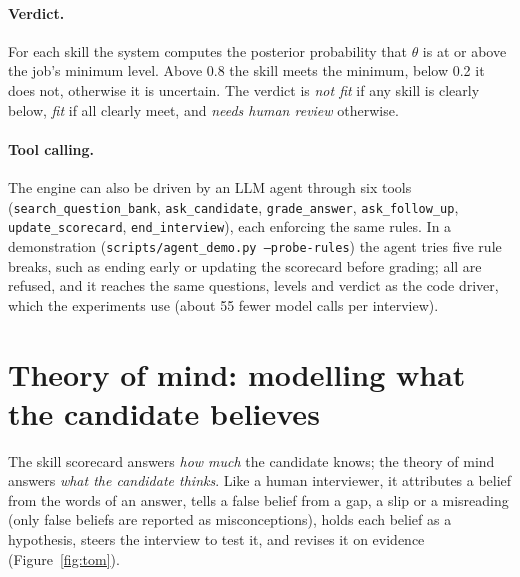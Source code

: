 \documentclass[10pt,a4paper]{article}
\begin{document}
\paragraph{Verdict.} For each skill the system computes the posterior probability that $\theta$ is
at or above the job's minimum level. Above 0.8 the skill meets the minimum, below 0.2 it does not,
otherwise it is uncertain. The verdict is \emph{not fit} if any skill is clearly below, \emph{fit} if
all clearly meet, and \emph{needs human review} otherwise.

\paragraph{Tool calling.} The engine can also be driven by an LLM agent through six tools
(\texttt{search\_question\_bank}, \texttt{ask\_candidate}, \texttt{grade\_answer},
\texttt{ask\_follow\_up}, \texttt{update\_scorecard}, \texttt{end\_interview}), each enforcing the same
rules. In a demonstration (\texttt{scripts/agent\_demo.py --probe-rules}) the agent tries five rule
breaks, such as ending early or updating the scorecard before grading; all are refused, and it reaches
the same questions, levels and verdict as the code driver, which the experiments use (about 55 fewer
model calls per interview).

\section{Theory of mind: modelling what the candidate believes}
\label{sec:tom}

The skill scorecard answers \emph{how much} the candidate knows; the theory of mind answers
\emph{what the candidate thinks}. Like a human interviewer, it attributes a belief from the words of an
answer, tells a false belief from a gap, a slip or a misreading (only false beliefs are reported as
misconceptions), holds each belief as a hypothesis, steers the interview to test it, and revises it on
evidence (Figure~\ref{fig:tom}).
\end{document}
